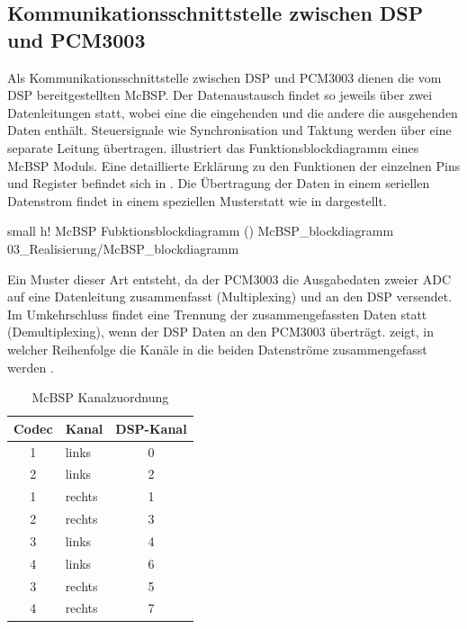\subsection{Kommunikationsschnittstelle zwischen DSP und PCM3003}
\label{subsec:Kommunikationsschnittstelle_DSP_PCM3003}
Als Kommunikationsschnittstelle zwischen DSP und PCM3003 dienen die vom DSP bereitgestellten McBSP. Der Datenaustausch findet so jeweils über zwei Datenleitungen statt, wobei eine die eingehenden und die andere die ausgehenden Daten enthält. Steuersignale wie Synchronisation und Taktung werden über eine separate Leitung übertragen.  illustriert das Funktionsblockdiagramm eines McBSP Moduls. Eine detaillierte Erklärung zu den Funktionen der einzelnen Pins und Register befindet sich in \cite{Manual_McBSP_Report}.
Die Übertragung der Daten in einem seriellen Datenstrom findet in einem speziellen Musterstatt wie in  dargestellt.


         {small}                                                       %
         {h!}                                                  %
         {McBSP Fubktionsblockdiagramm (\vgl \cite[S. 2]{Manual_McBSP_Report})}    %
         {McBSP_blockdiagramm}                                               %
         {03_Realisierung/McBSP_blockdiagramm} 



Ein Muster dieser Art entsteht, da der PCM3003 die Ausgabedaten zweier ADC auf eine Datenleitung zusammenfasst (Multiplexing) und an den DSP versendet. Im Umkehrschluss findet eine Trennung der zusammengefassten Daten statt (Demultiplexing), wenn der DSP Daten an den PCM3003 überträgt.  zeigt, in welcher Reihenfolge die Kanäle in die beiden Datenströme zusammengefasst werden \cite{Code_PCM3003Demo}. 

\begin{table}[h]
     \center
     \begin{tabular}{clc}
     \hline
          Codec & Kanal &  DSP-Kanal  \\
          \hline \hline
          1     & links      & 0      \\
          2     & links      & 2      \\
          1     & rechts     & 1      \\
          2     & rechts     & 3      \\
          3     & links      & 4      \\
          4     & links      & 6      \\
          3     & rechts     & 5      \\
          4     & rechts     & 7      \\
         \hline
     \end{tabular}
  \caption{McBSP Kanalzuordnung}
 \label{tab:McBSP_Muster}
 \end{table}




